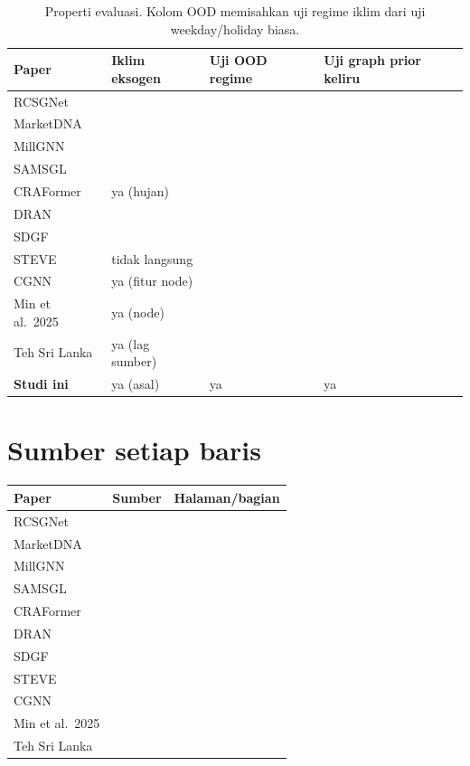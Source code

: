 \documentclass[11pt,a4paper]{article}
\begin{document}
\begin{table}[H]
\centering
\footnotesize
\setlength{\tabcolsep}{4pt}
\begin{tabular}{@{}L{2.4cm}C{2.0cm}C{1.8cm}L{5.6cm}@{}}
\toprule
Paper & Iklim eksogen & Uji OOD regime & Uji graph prior keliru \\
\midrule
RCSGNet & \todo{} & \todo{} & \todo{} \\
MarketDNA & \todo{} & \todo{} & \todo{} \\
MillGNN & \todo{} & \todo{} & \todo{} \\
SAMSGL & \todo{} & \todo{} & \todo{} \\
CRAFormer & ya (hujan) & \todo{} & \todo{} \\
DRAN & \todo{} & \todo{} & \todo{} \\
SDGF & \todo{} & \todo{} & \todo{} \\
STEVE & tidak langsung & \todo{} & \todo{} \\
CGNN & ya (fitur node) & \todo{} & \todo{} \\
Min et al.\ 2025 & ya (node) & \todo{} & \todo{} \\
Teh Sri Lanka & ya (lag sumber) & \todo{} & \todo{} \\
\midrule
\textbf{Studi ini} & ya (asal) & ya & ya \\
\bottomrule
\end{tabular}
\caption{Properti evaluasi. Kolom OOD memisahkan uji regime iklim dari uji
weekday/holiday biasa.}
\end{table}

\section{Sumber setiap baris}
\begin{table}[H]
\centering
\small
\begin{tabular}{@{}L{3.2cm}L{6.0cm}L{5.2cm}@{}}
\toprule
Paper & Sumber & Halaman/bagian \\
\midrule
RCSGNet &  & \todo{} \\
MarketDNA & \todo{} & \todo{} \\
MillGNN & \todo{} & \todo{} \\
SAMSGL & \todo{} & \todo{} \\
CRAFormer & \todo{} & \todo{} \\
DRAN & \todo{} & \todo{} \\
SDGF & \todo{} & \todo{} \\
STEVE & \todo{} & \todo{} \\
CGNN & \todo{} & \todo{} \\
Min et al.\ 2025 & \todo{} & \todo{} \\
Teh Sri Lanka & \todo{} & \todo{} \\
\bottomrule
\end{tabular}
\end{table}
\end{document}
